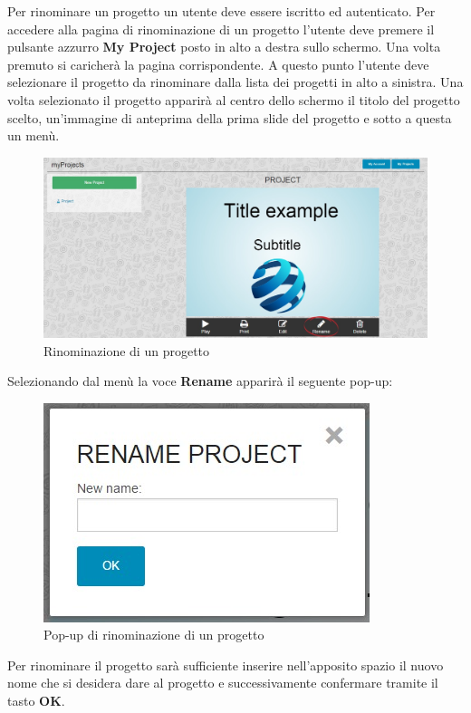 Per rinominare un progetto un utente deve essere iscritto ed autenticato. Per accedere alla pagina di rinominazione di un progetto l'utente deve premere il pulsante azzurro \textbf{My Project} posto in alto a destra sullo schermo. Una volta premuto si caricherà la pagina corrispondente. A questo punto l'utente deve selezionare il progetto da rinominare dalla lista dei progetti in alto a sinistra.
Una volta selezionato il progetto apparirà al centro dello schermo il titolo del progetto scelto, un'immagine di anteprima della prima slide del progetto e sotto a questa un menù. 

\begin{figure}[H] 
	\centering 
	\includegraphics[scale=0.40] {img/rinomina_pro}
	\caption{Rinominazione di un progetto} 
\end{figure}

Selezionando dal menù la voce \textbf{Rename} apparirà il seguente pop-up:

\begin{figure}[H] 
	\centering 
	\includegraphics[scale=0.60] {img/rename_project}
	\caption{Pop-up di rinominazione di un progetto} 
\end{figure}

\noindent Per rinominare il progetto sarà sufficiente inserire nell'apposito spazio il nuovo nome che si desidera dare al progetto e successivamente confermare tramite il tasto \textbf{OK}. 